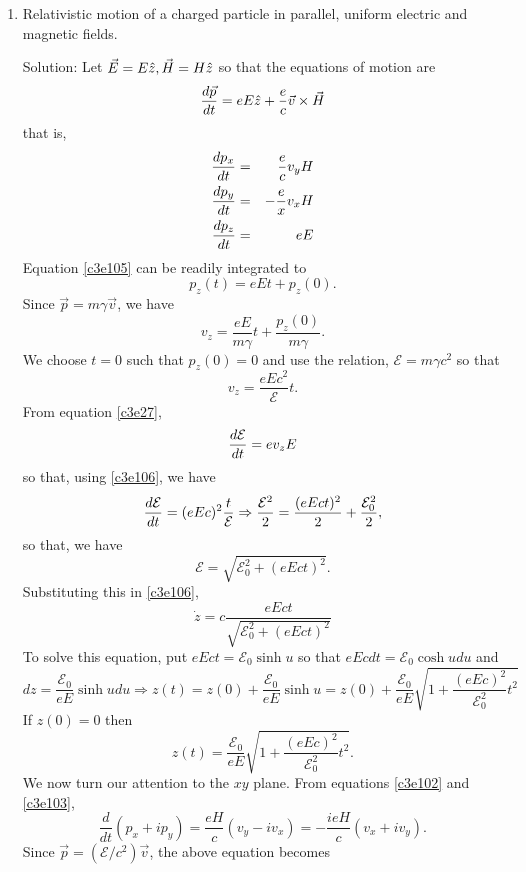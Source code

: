 \begin{enumerate}
\item Relativistic motion of a charged particle in parallel, uniform electric
and magnetic fields.
\item[Solution:] Let $\vec{E} = E\hat{z}, \vec{H} = H\hat{z}$ so that the 
equations of motion are
\[
\frac{d{\vec{p}}}{d{t}} = eE\hat{z} + \frac{e}{c}\vec{v}\times\vec{H}
\]
that is,
\begin{eqnarray}
\frac{d{p_x}}{d{t}} &=& \frac{e}{c}v_yH \label{c3e103} \\
\frac{d{p_y}}{d{t}} &=& -\frac{e}{x}v_xH \label{c3e104} \\
\frac{d{p_z}}{d{t}} &=& eE \label{c3e105} 
\end{eqnarray}
Equation \eqref{c3e105} can be readily integrated to
\[
p_z(t) = eEt + p_z(0).
\]
Since $\vec{p} = m\gamma\vec{v}$, we have
\begin{equation}\label{c3e106} 
v_z = \frac{eE}{m\gamma}t + \frac{p_z(0)}{m\gamma}.
\end{equation}
We choose $t = 0$ such that $p_z(0) = 0$ and use the relation, 
$\mathcal{E} = m\gamma c^2$ so that
\begin{equation}\label{c3e107}
v_z = \frac{eEc^2}{\mathcal{E}}t.
\end{equation} 
From equation \eqref{c3e27},
\[
\frac{d{\mathcal{E}}}{d{t}} = ev_zE
\]
so that, using \eqref{c3e106}, we have 
\[
\frac{d{\mathcal{E}}}{d{t}} = (eEc)^2\frac{t}{\mathcal{E}} \Rightarrow
\frac{\mathcal{E}^2}{2} = \frac{(eEct)^2}{2} + \frac{\mathcal{E}_0^2}{2},
\]
so that, we have
\begin{equation}\label{c3e108}
\mathcal{E} = \sqrt{\mathcal{E}_0^2 + (eEct)^2}.
\end{equation}
Substituting this in \eqref{c3e106},
\[
\dot{z} = c\frac{eEct}{\sqrt{\mathcal{E}_0^2 + (eEct)^2}}
\]
To solve this equation, put $eEct = \mathcal{E}_0\sinh u$ so that $eEcdt = 
\mathcal{E}_0\cosh udu$ and
\[
dz = \frac{\mathcal{E}_0}{eE}\sinh udu \Rightarrow
z(t) = z(0) + \frac{\mathcal{E}_0}{eE}\sinh u = z(0) + \frac{\mathcal{E}_0}{eE}
\sqrt{1 + \frac{(eEc)^2}{\mathcal{E}_0^2}t^2}
\]
If $z(0) = 0$ then 
\begin{equation}\label{c3e109}
z(t) = \frac{\mathcal{E}_0}{eE}\sqrt{1 + \frac{(eEc)^2}{\mathcal{E}_0^2}t^2}.
\end{equation}
We now turn our attention to the $xy$ plane. From equations \eqref{c3e102} and
\eqref{c3e103},
\[
\frac{d}{dt}(p_x + ip_y) = \frac{eH}{c}(v_y - iv_x) = 
-\frac{ieH}{c}(v_x + iv_y).
\]
Since $\vec{p} = (\mathcal{E}/c^2)\vec{v}$, the above equation becomes
\begin{equation}\label{c3e110}

\end{equation}
\end{enumerate}
